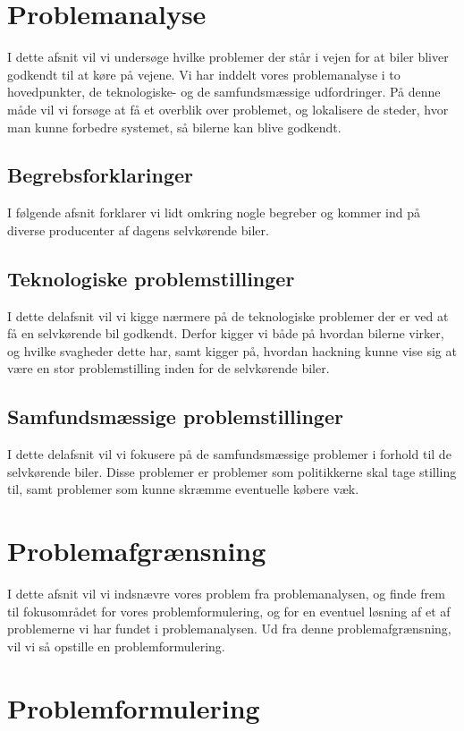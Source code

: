 \documentclass[12pt,hidelinks]{article}
\begin{document}
	\section{Problemanalyse}
	{I dette afsnit vil vi undersøge hvilke problemer der står i vejen for at biler bliver godkendt til at køre på vejene. Vi har inddelt vores problemanalyse i to hovedpunkter, de teknologiske- og de samfundsmæssige udfordringer. På denne måde vil vi forsøge at få et overblik over problemet, og lokalisere de steder, hvor man kunne forbedre systemet, så bilerne kan blive godkendt.}
	\subsection{Begrebsforklaringer}
	{I følgende afsnit forklarer vi lidt omkring nogle begreber og kommer ind på diverse producenter af dagens selvkørende biler.}
	
	\subsection{Teknologiske problemstillinger}
	I dette delafsnit vil vi kigge nærmere på de teknologiske problemer der er ved at få en selvkørende bil godkendt. Derfor kigger vi både på hvordan bilerne virker, og hvilke svagheder dette har, samt kigger på, hvordan hackning kunne vise sig at være en stor problemstilling inden for de selvkørende biler.
	
	
	
	\subsection{Samfundsmæssige problemstillinger}
	I dette delafsnit vil vi fokusere på de samfundsmæssige problemer i forhold til de selvkørende biler. Disse problemer er problemer som politikkerne skal tage stilling til, samt problemer som kunne skræmme eventuelle købere væk.
	
	
    
	\section{Problemafgrænsning}
	{I dette afsnit vil vi indsnævre vores problem fra problemanalysen, og finde frem til fokusområdet for vores problemformulering, og for en eventuel løsning af et af problemerne vi har fundet i problemanalysen. Ud fra denne problemafgrænsning, vil vi så opstille en problemformulering.}
    
	
    \section{Problemformulering}
    
	
	
\end{document}
